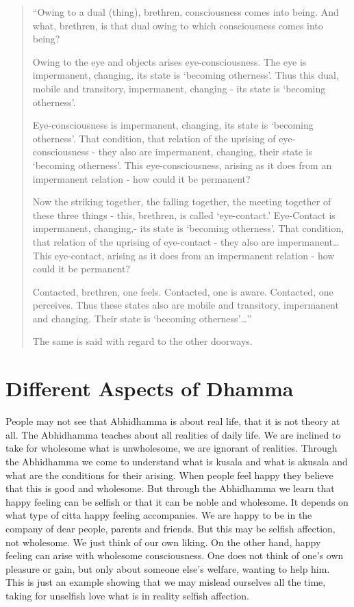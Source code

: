 \documentclass{book}
\begin{document}
\begin{quote}
``Owing to a dual (thing), brethren,
consciousness comes into being. And what, brethren, is that dual owing
to which consciousness comes into
being?

Owing to the eye and objects arises
eye-consciousness. The eye is impermanent, changing, its state is
`becoming otherness'. Thus this dual, mobile and transitory,
impermanent, changing - its state is
`becoming otherness'.

Eye-consciousness
is impermanent, changing, its state is
`becoming otherness'. That
condition, that relation of the uprising of eye-consciousness - they also
are impermanent, changing, their state is
`becoming otherness'. This
eye-consciousness, arising as it does from an impermanent relation - how
could it be permanent?

Now the striking together, the falling
together, the meeting together of these three things - this, brethren,
is called `eye-contact.' Eye-Contact is impermanent, changing,- its
state is `becoming
otherness'. That condition, that relation of the uprising of
eye-contact - they also are impermanent\ldots This eye-contact,
arising as it does from an impermanent relation - how could it be
permanent?

Contacted, brethren, one feels. Contacted,
one is aware. Contacted, one perceives. Thus these states also are
mobile and transitory, impermanent and changing. Their state is
`becoming
otherness'\ldots''

The same is said with regard to the other
doorways. 
\end{quote}




\section*{Different Aspects of Dhamma}


People may
not see that Abhidhamma is about real life, that it is not theory at
all. The Abhidhamma teaches about all realities of daily
life. We are inclined to take for wholesome what is unwholesome, we are
ignorant of realities. Through the Abhidhamma we come to understand what
is kusala and what is akusala and what 
are the conditions for their arising.
When people feel happy they believe that
this is good and wholesome. But through the Abhidhamma we learn that
happy feeling can be selfish or that it can be noble and wholesome. It
depends on what type of citta happy feeling accompanies. We are happy to
be in the company of dear people, parents and friends. But this may be
selfish affection, not wholesome. We just think of our own liking. On
the other hand, happy feeling can arise with wholesome consciousness.
One does not think of one's own pleasure or gain, but
only about someone else's
welfare, wanting to help him. This is just an example showing that we
may mislead ourselves all the time, taking for unselfish love what is in
reality selfish affection.~
\end{document}
